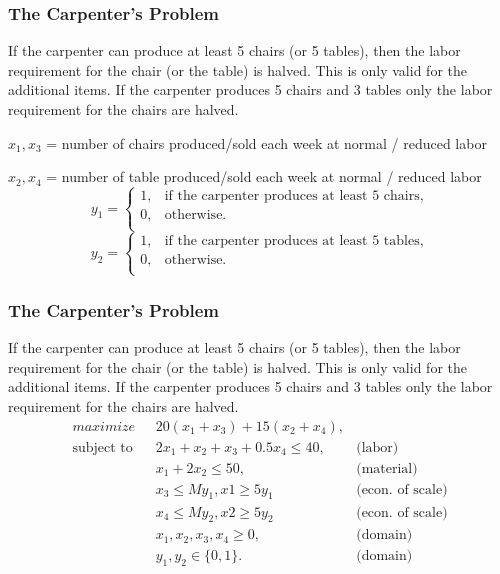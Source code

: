 \documentclass[11pt]{beamer}
\begin{document}
\begin{frame}
\frametitle{The Carpenter's Problem}
If the carpenter can produce at least 5 chairs (or 5 tables), then the labor requirement for the chair (or the table) is halved. This is only valid for the additional items. If the carpenter produces 5 chairs and 3 tables only the labor requirement for the chairs are halved.

\pause
$x_1, x_3$ = number of chairs produced/sold each week at normal / reduced labor

$x_2, x_4$ = number of table produced/sold each week at normal / reduced labor
\pause
\begin{equation}\nonumber
    y_{1} =
    \begin{cases}
      1, & \text{if the carpenter produces at least 5 chairs,} \\
      0, & \text{otherwise.} \\
    \end{cases}
  \end{equation}\begin{equation}\nonumber
    y_{2} =
    \begin{cases}
      1, & \text{if the carpenter produces at least 5 tables,} \\
      0, & \text{otherwise.} \\
    \end{cases}
  \end{equation}
\end{frame}

\begin{frame}
\frametitle{The Carpenter's Problem}
If the carpenter can produce at least 5 chairs (or 5 tables), then the labor requirement for the chair (or the table) is halved. This is only valid for the additional items. If the carpenter produces 5 chairs and 3 tables only the labor requirement for the chairs are halved.
\begin{align}
\displaystyle maximize \mbox{ } & 20(x_1 + x_3) + 15(x_2+x_4), \label{carpenter4:objective} \\
% 
\mbox{subject to }&2 x_1 + x_2 +x_3 + 0.5x_4 \leq 40, & \mbox{(labor)}  \label{carpenter4:labor}\\
&x_1 + 2 x_2 \leq 50, & \mbox{(material)}  \label{carpenter4:material}\\
& x_3 \leq M y_1, x1 \geq 5 y_1 & \mbox{(econ. of scale)}  \label{carpenter4:fixed1}\\
& x_4 \leq M y_2, x2 \geq 5 y_2 & \mbox{(econ. of scale)}  \label{carpenter4:fixed2}\\
& x_1, x_2, x_3, x_4 \geq 0, & \mbox{(domain)} \label{carpenter4:domain}\\
& y_1, y_2 \in \{0,1\}. & \mbox{(domain)} \label{carpenter4:domain2}
\end{align}

\end{frame}
\end{document}
